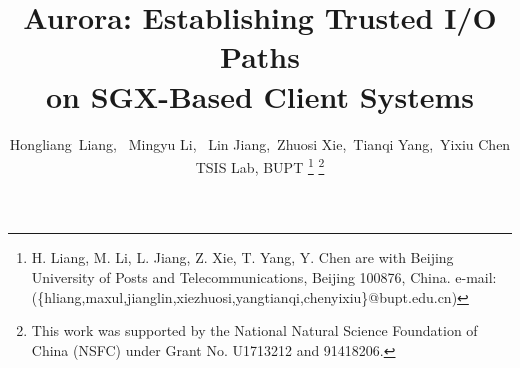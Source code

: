 \documentclass[journal,twocolumn,letterpaper,10pt]{ieee-sty/IEEEtran}
\begin{document}


\title{Aurora: Establishing Trusted I/O Paths\\ on SGX-Based Client Systems}

\author{Hongliang~Liang,~
	Mingyu Li,%
	~Lin Jiang,~Zhuosi Xie,~Tianqi Yang,~Yixiu Chen\\
	TSIS Lab, BUPT
	\thanks{H. Liang, M. Li, L. Jiang, Z. Xie, T. Yang, Y. Chen 
  are with Beijing University of Posts and Telecommunications, Beijing 100876, China. e-mail: (\{hliang,maxul,jianglin,xiezhuosi,yangtianqi,chenyixiu\}@bupt.edu.cn)
  }%
	\thanks{This work was supported by the National Natural Science Foundation of China (NSFC) under Grant No. U1713212 and 91418206.}
}

\maketitle









\end{document}
